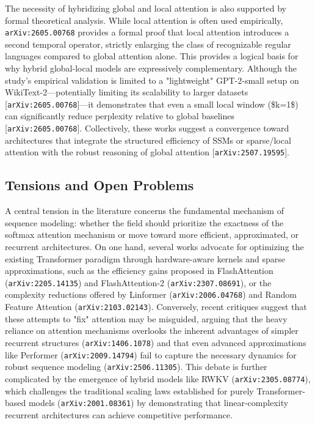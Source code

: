 \documentclass[11pt]{article}
\begin{document}
The necessity of hybridizing global and local attention is also supported by formal theoretical analysis. While local attention is often used empirically, \texttt{arXiv:2605.00768} provides a formal proof that local attention introduces a second temporal operator, strictly enlarging the class of recognizable regular languages compared to global attention alone. This provides a logical basis for why hybrid global-local models are expressively complementary. Although the study's empirical validation is limited to a "lightweight" GPT-2-small setup on WikiText-2—potentially limiting its scalability to larger datasets [\texttt{arXiv:2605.00768}]—it demonstrates that even a small local window (\$k=1\$) can significantly reduce perplexity relative to global baselines [\texttt{arXiv:2605.00768}]. Collectively, these works suggest a convergence toward architectures that integrate the structured efficiency of SSMs or sparse/local attention with the robust reasoning of global attention [\texttt{arXiv:2507.19595}].

\subsection{Tensions and Open Problems}

A central tension in the literature concerns the fundamental mechanism of sequence modeling: whether the field should prioritize the exactness of the softmax attention mechanism or move toward more efficient, approximated, or recurrent architectures. On one hand, several works advocate for optimizing the existing Transformer paradigm through hardware-aware kernels and sparse approximations, such as the efficiency gains proposed in FlashAttention (\texttt{arXiv:2205.14135}) and FlashAttention-2 (\texttt{arXiv:2307.08691}), or the complexity reductions offered by Linformer (\texttt{arXiv:2006.04768}) and Random Feature Attention (\texttt{arXiv:2103.02143}). Conversely, recent critiques suggest that these attempts to "fix" attention may be misguided, arguing that the heavy reliance on attention mechanisms overlooks the inherent advantages of simpler recurrent structures (\texttt{arXiv:1406.1078}) and that even advanced approximations like Performer (\texttt{arXiv:2009.14794}) fail to capture the necessary dynamics for robust sequence modeling (\texttt{arXiv:2506.11305}). This debate is further complicated by the emergence of hybrid models like RWKV (\texttt{arXiv:2305.08774}), which challenges the traditional scaling laws established for purely Transformer-based models (\texttt{arXiv:2001.08361}) by demonstrating that linear-complexity recurrent architectures can achieve competitive performance.
\end{document}
